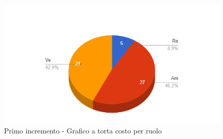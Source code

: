 {{\begin{longtable}{C{.3\freewidth} C{.2\freewidth} C{.2\freewidth}}
        \end{longtable}
        \begin{figure}[H]
          \includegraphics[width=15cm]{sezioni/Images/primoT.png}
          \centering
          \caption{Primo incremento - Grafico a torta costo per ruolo}
       \end{figure}
    }
}
  
